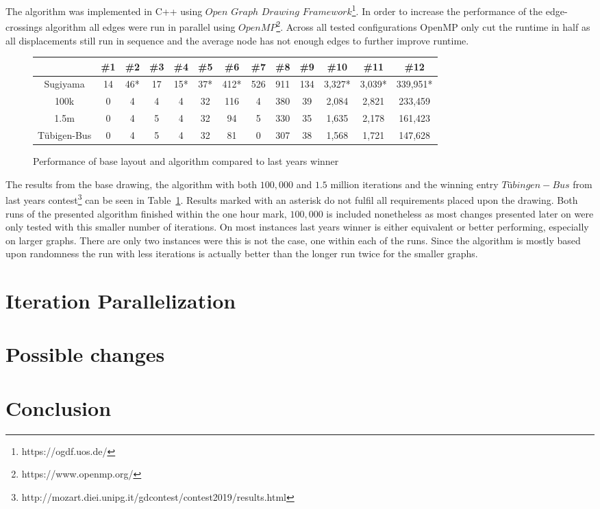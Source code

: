\documentclass[]{llncs}
\begin{document}
\medskip
The algorithm was implemented in C++ using $Open$ $Graph$ $Drawing$ $Framework$\footnote{https://ogdf.uos.de/}. In order to increase the performance of the edge-crossings algorithm all edges were run in parallel using $OpenMP$\footnote{https://www.openmp.org/}. Across all tested configurations OpenMP only cut the runtime in half as all displacements still run in sequence and the average node has not enough edges to further improve runtime.

\begin{figure}
\centering
\begin{tabular}{|c|c|c|c|c|c|c|c|c|c|c|c|c|}
	\hline 
	& \#1 & \#2 & \#3 & \#4 & \#5 & \#6 & \#7 & \#8 & \#9 & \#10 & \#11 & \#12 \\
	\hline 
    Sugiyama & 14 & 46* & 17 & 15* & 37* & 412* & 526 & 911 & 134 & 3,327* & 3,039* & 339,951* \\  
	\hline
	100k & 0 & 4 & 4 & 4 & 32 & 116 & 4 & 380 & 39 & 2,084 & 2,821 & 233,459 \\
	\hline
	1.5m & 0 & 4 & 5 & 4 & 32 & 94 & 5 & 330 & 35 & 1,635 & 2,178 & 161,423 \\
	\hline
	Tübigen-Bus & 0 & 4 & 5 & 4 & 32 & 81 & 0 & 307 & 38 & 1,568 & 1,721 & 147,628 \\
	\hline 
\end{tabular}
\caption{Performance of base layout and algorithm compared to last years winner}
\label{best-res}
\end{figure}

The results from the base drawing, the algorithm with both $100,000$ and $1.5$ million iterations and the winning entry $Tübingen-Bus$ from last years contest\footnote{http://mozart.diei.unipg.it/gdcontest/contest2019/results.html} can be seen in Table~\ref{best-res}. Results marked with an asterisk do not fulfil all requirements placed upon the drawing. Both runs of the presented algorithm finished within the one hour mark, $100,000$ is included nonetheless as most changes presented later on were only tested with this smaller number of iterations. On most instances last years winner is either equivalent or better performing, especially on larger graphs. There are only two instances were this is not the case, one within each of the runs. Since the algorithm is mostly based upon randomness the run with less iterations is actually better than the longer run twice for the smaller graphs.

	\section{Iteration Parallelization}

	\section{Possible changes}

    \section{Conclusion}

    \printbibliography
\end{document}
